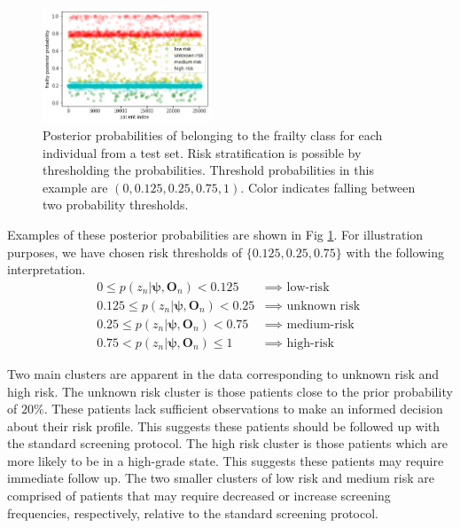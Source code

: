 \documentclass{article}
\begin{document}
\begin{figure}
	\centering
	\includegraphics[width = 0.45\textwidth]{pic/hierarchical-hmm-posterior-frailty-probs.png}
	\caption{Posterior probabilities of belonging to the frailty class for each individual from a test set. Risk stratification is possible by thresholding the probabilities. Threshold probabilities in this example are $(0, 0.125,0.25, 0.75,1)$. Color indicates falling between two probability thresholds.}
	\label{posterior_frailties}
\end{figure}

Examples of these posterior probabilities are shown in Fig \ref{posterior_frailties}. For illustration purposes, we have chosen risk thresholds of $\{0.125,0.25, 0.75\}$ with the following interpretation.
\begin{align*}
0 \leq p(z_n | \bm \psi, {\bm O}_n) < 0.125 &\implies \text{ low-risk  } \\
0.125 \leq p(z_n | \bm \psi, {\bm O}_n)  < 0.25 &\implies \text{ unknown risk  }\\
0.25 \leq p(z_n | \bm \psi, {\bm O}_n)  < 0.75      &\implies \text{ medium-risk }\\
0.75 <  p(z_n | \bm \psi, {\bm O}_n) \leq 1 &\implies \text{ high-risk } 
\end{align*}

Two main clusters are apparent in the data corresponding to unknown risk and high risk. The unknown risk cluster is those patients close to the prior probability of $20\%$.  These patients lack sufficient observations to make an informed decision about their risk profile.  This suggests these patients should be followed up with the standard screening protocol.  The high risk cluster is those patients which are more likely to be in a high-grade state.  This suggests these patients may require immediate follow up.  The two smaller clusters of low risk and medium risk are comprised of patients that may require decreased or increase screening frequencies, respectively, relative to the standard screening protocol. 
\end{document}
